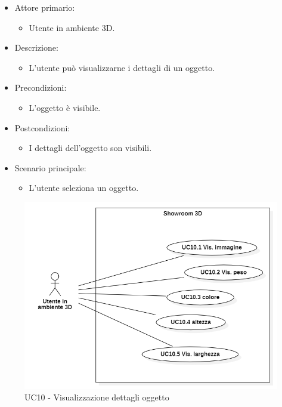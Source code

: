\begin{itemize}
	
	\item Attore primario: 
	\begin{itemize}
		\item Utente in ambiente 3D.
	\end{itemize}
	\item Descrizione:
	\begin{itemize}
		\item L'utente può visualizzarne i dettagli di un oggetto.
	\end{itemize}
	
	\item Precondizioni:
	\begin{itemize}
		\item L'oggetto è visibile.
	\end{itemize}
	
	\item Postcondizioni:
	\begin{itemize}
		\item I dettagli dell'oggetto son visibili.
	\end{itemize}
	
	\item Scenario principale:
	\begin{itemize}
		\item L'utente seleziona un oggetto.
	\end{itemize}
	
\end{itemize}

\begin{figure}[H]
  \renewcommand{\thefigure}{12}
  \includegraphics[width=\linewidth]{./res/images/UC10-sottocasi.png}
  \caption{UC10 - Visualizzazione dettagli oggetto}
  \label{fig:UC 10}
\end{figure}

